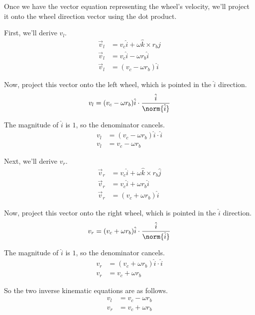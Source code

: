 Once we have the vector equation representing the wheel's velocity, we'll
project it onto the wheel direction vector using the dot product.

First, we'll derive $v_l$.
\begin{align*}
  \vec{v}_l &= v_c \hat{i} + \omega \hat{k} \times r_b \hat{j} \\
  \vec{v}_l &= v_c \hat{i} - \omega r_b \hat{i} \\
  \vec{v}_l &= (v_c - \omega r_b) \hat{i}
\end{align*}

Now, project this vector onto the left wheel, which is pointed in the $\hat{i}$
direction.
\begin{equation*}
  v_l = (v_c - \omega r_b) \hat{i} \cdot \frac{\hat{i}}{\norm{\hat{i}}}
\end{equation*}

The magnitude of $\hat{i}$ is $1$, so the denominator cancels.
\begin{align}
  v_l &= (v_c - \omega r_b) \hat{i} \cdot \hat{i} \nonumber \\
  v_l &= v_c - \omega r_b \label{eq:diff_vl}
\end{align}

Next, we'll derive $v_r$.
\begin{align*}
  \vec{v}_r &= v_c \hat{i} + \omega \hat{k} \times r_b \hat{j} \\
  \vec{v}_r &= v_c \hat{i} + \omega r_b \hat{i} \\
  \vec{v}_r &= (v_c + \omega r_b) \hat{i}
\end{align*}

Now, project this vector onto the right wheel, which is pointed in the $\hat{i}$
direction.
\begin{equation*}
  v_r = (v_c + \omega r_b) \hat{i} \cdot \frac{\hat{i}}{\norm{\hat{i}}}
\end{equation*}

The magnitude of $\hat{i}$ is $1$, so the denominator cancels.
\begin{align}
  v_r &= (v_c + \omega r_b) \hat{i} \cdot \hat{i} \nonumber \\
  v_r &= v_c + \omega r_b \label{eq:diff_vr}
\end{align}

So the two inverse kinematic equations are as follows.
\begin{align}
  v_l &= v_c - \omega r_b \\
  v_r &= v_c + \omega r_b
\end{align}

